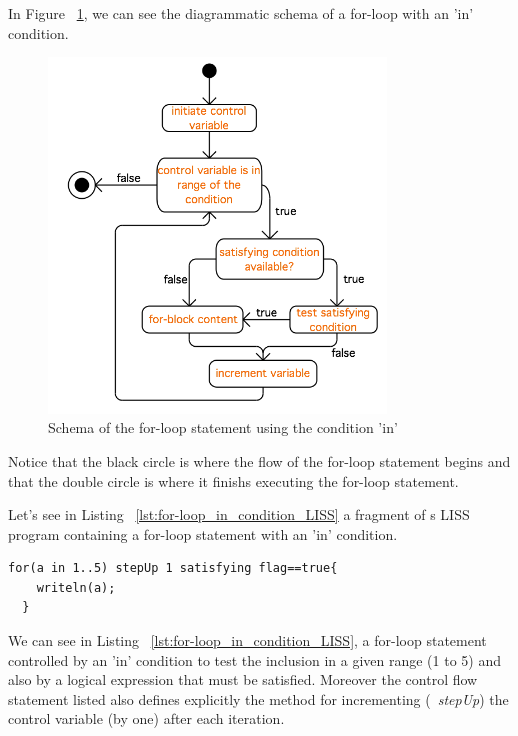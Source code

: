 \documentclass[
  oneside,
  11pt, a4paper,
  footinclude=true,
  headinclude=true,
  cleardoublepage=empty
]{scrbook}
\begin{document}
In Figure ~\ref{fig:for-loop_in}, we can see the diagrammatic schema of a for-loop with an 'in' condition.

\begin{figure}[h!]
  \centering
    \includegraphics[width=0.8\textwidth]{img/for-loop_in.png}
    \caption{Schema of the for-loop statement using the condition 'in'}
    \label{fig:for-loop_in}
\end{figure}

Notice that the black circle is where the flow of the for-loop statement begins and that the double circle is where it finishs executing the for-loop statement.

Let's see  in Listing ~\ref{lst:for-loop_in_condition_LISS} a fragment of s LISS program containing a for-loop statement with an 'in' condition.

\begin{lstlisting}[caption={Example of a for-loop statement with 'in' condition in LISS},label={lst:for-loop_in_condition_LISS}]
  for(a in 1..5) stepUp 1 satisfying flag==true{
    writeln(a);
  }
\end{lstlisting}

We can see in Listing ~\ref{lst:for-loop_in_condition_LISS}, a for-loop statement controlled by an 'in' condition to test the inclusion in a given range (1 to 5) and also by a logical expression that must be satisfied. Moreover the control flow statement listed also defines explicitly the method for incrementing (~\textit{stepUp}) the control variable (by one) after each iteration.
\end{document}
